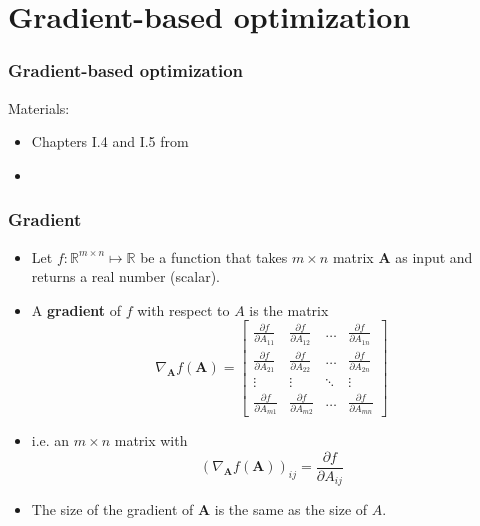 \documentclass[notes]{beamer}          %
\newcommand{\vect}[1]{\bm{#1}}
\newcommand{\field}[1]{\mathbb{#1}}
\newcommand{\R}{\field{R}}
\begin{document}
\section{Gradient-based optimization}


\begin{frame}
\frametitle{Gradient-based optimization}
Materials:
\begin{itemize}
    \item Chapters I.4 and I.5 from \cite{deeplearning}
    \item \cite{linearalgebra}
\end{itemize}
\end{frame}

\begin{frame}
\frametitle{Gradient}
    \begin{itemize}
        \item Let $f: \R^{m \times n} \mapsto \R$ be a function that takes $m \times n$ matrix $\vect{A}$ as input and returns a real number (scalar).
        \item A {\bf gradient} of $f$ with respect to $A$ is the matrix
        $$
        \nabla_{\vect{A}} f(\vect{A}) =
        \begin{bmatrix}
         \frac{\partial f}{\partial A_{11}} & \frac{\partial f}{\partial A_{12}} & \ldots & \frac{\partial f}{\partial A_{1n}} \\
          \frac{\partial f}{\partial A_{21}} & \frac{\partial f}{\partial A_{22}} & \ldots & \frac{\partial f}{\partial A_{2n}} \\
          \vdots & \vdots & \ddots & \vdots \\
           \frac{\partial f}{\partial A_{m1}} & \frac{\partial f}{\partial A_{m2}} & \ldots & \frac{\partial f}{\partial A_{mn}}
        \end{bmatrix}
        $$
        \item i.e. an $m \times n$ matrix with  $$(\nabla_{\vect{A}} f(\vect{A}))_{ij} = \frac{\partial f}{\partial A_{ij}}  $$
        \item The size of the gradient of $\vect{A}$ is the same as the size of $A$.

    \end{itemize}
\end{frame}
\end{document}
